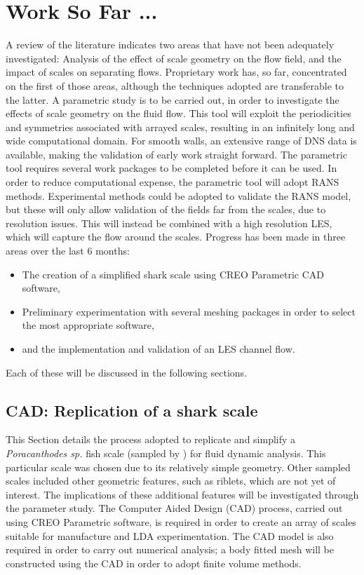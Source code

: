 \documentclass[12pt,oneside,a4paper]{article}
\begin{document}
\newpage
\section{Work So Far ...}
A review of the literature indicates two areas that have not been adequately investigated: Analysis of the effect of scale geometry on the flow field, and the impact of scales on separating flows. Proprietary work has, so far, concentrated on the first of those areas, although the techniques adopted are transferable to the latter. A parametric study is to be carried out, in order to investigate the effects of scale geometry on the fluid flow. This tool will exploit the periodicities and symmetries associated with arrayed scales, resulting in an infinitely long and wide computational domain. For smooth walls, an extensive range of DNS data is available, making the validation of early work straight forward. The parametric tool requires several work packages to be completed before it can be used. In order to reduce computational expense, the parametric tool will adopt RANS methods. Experimental methods could be adopted to validate the RANS model, but these will only allow validation of the fields far from the scales, due to resolution issues. This will instead be combined with a high resolution LES, which will capture the flow around the scales. Progress has been made in three areas over the last 6 months:

\begin{itemize}
\itemsep0em
\item The creation of a simplified shark scale using CREO Parametric CAD software,

\item Preliminary experimentation with several meshing packages in order to select the most appropriate software,

\item and the implementation and validation of an LES channel flow.
\end{itemize}

Each of these will be discussed in the following sections.

\subsection{CAD: Replication of a shark scale}
\label{section:cad}
This Section details the process adopted to replicate and simplify a \textit{Poracanthodes sp.} fish scale (sampled by \cite{fletcher2014phd}) for fluid dynamic analysis. This particular scale was chosen due to its relatively simple geometry. Other sampled scales included other geometric features, such as riblets, which are not yet of interest. The implications of these additional features will be investigated through the parameter study. The Computer Aided Design (CAD) process, carried out using CREO Parametric software, is required in order to create an array of scales suitable for manufacture and LDA experimentation. The CAD model is also required in order to carry out numerical analysis; a body fitted mesh will be constructed using the CAD in order to adopt finite volume methods.
\end{document}
